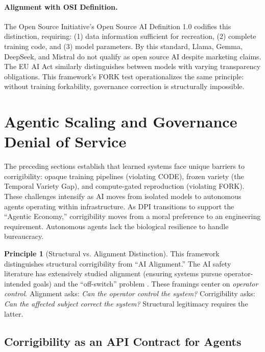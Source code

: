\documentclass[11pt,a4paper]{article}
\theoremstyle{definition}
\newtheorem{principle}{Principle}[section]
\begin{document}
\paragraph{Alignment with OSI Definition.} The Open Source Initiative's Open Source AI Definition 1.0 \citep{osi2024} codifies this distinction, requiring: (1) data information sufficient for recreation, (2) complete training code, and (3) model parameters. By this standard, Llama, Gemma, DeepSeek, and Mistral do not qualify as open source AI despite marketing claims. The EU AI Act \citep{euaiact2024} similarly distinguishes between models with varying transparency obligations. This framework's FORK test operationalizes the same principle: without training forkability, governance correction is structurally impossible.


\section{Agentic Scaling and Governance Denial of Service}
\label{sec:agentic}

The preceding sections establish that learned systems face unique barriers to corrigibility: opaque training pipelines (violating CODE), frozen variety (the Temporal Variety Gap), and compute-gated reproduction (violating FORK). These challenges intensify as AI moves from isolated models to autonomous agents operating within infrastructure. As DPI transitions to support the ``Agentic Economy,'' corrigibility moves from a moral preference to an engineering requirement. Autonomous agents lack the biological resilience to handle bureaucracy.

\begin{principle}[Structural vs. Alignment Distinction]
This framework distinguishes structural corrigibility from ``AI Alignment.'' The AI safety literature has extensively studied alignment (ensuring systems pursue operator-intended goals) \citep{soares2017} and the ``off-switch'' problem \citep{hadfield2017}. These framings center on \textit{operator control}. Alignment asks: \textit{Can the operator control the system?} Corrigibility asks: \textit{Can the affected subject correct the system?} Structural legitimacy requires the latter.
\end{principle}

\subsection{Corrigibility as an API Contract for Agents}
\end{document}
